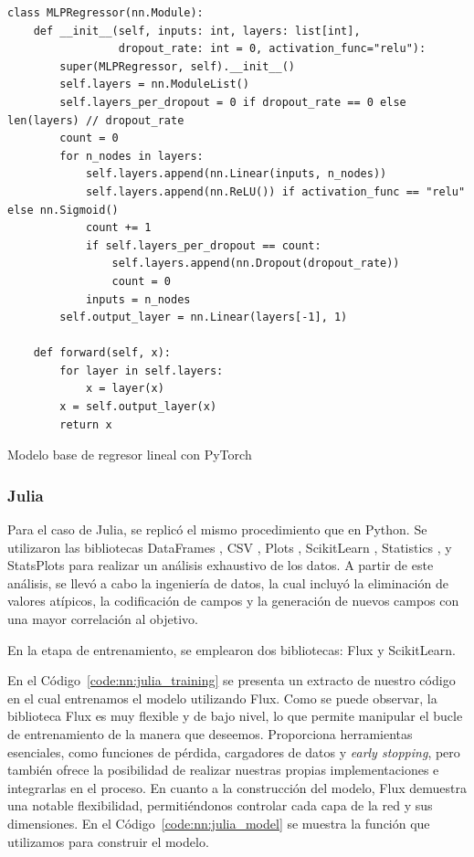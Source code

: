 \documentclass[11pt]{article}
\let\Oldsubsubsection\subsubsection
\renewcommand{\subsubsection}{\FloatBarrier\Oldsubsubsection}
\begin{document}
\begin{listing}[H]
\begin{verbatim}
class MLPRegressor(nn.Module):
    def __init__(self, inputs: int, layers: list[int],
                 dropout_rate: int = 0, activation_func="relu"):
        super(MLPRegressor, self).__init__()
        self.layers = nn.ModuleList()
        self.layers_per_dropout = 0 if dropout_rate == 0 else len(layers) // dropout_rate
        count = 0
        for n_nodes in layers:
            self.layers.append(nn.Linear(inputs, n_nodes))
            self.layers.append(nn.ReLU()) if activation_func == "relu" else nn.Sigmoid()
            count += 1
            if self.layers_per_dropout == count:
                self.layers.append(nn.Dropout(dropout_rate))
                count = 0
            inputs = n_nodes
        self.output_layer = nn.Linear(layers[-1], 1)
        
    def forward(self, x):
        for layer in self.layers:
            x = layer(x)
        x = self.output_layer(x)
        return x
\end{verbatim}
\caption{Modelo base de regresor lineal con PyTorch}
\label{code:nn:python_pytorch}
\end{listing}

\subsubsection{Julia}

Para el caso de Julia, se replicó el mismo procedimiento que en Python. Se utilizaron las bibliotecas DataFrames \cite{jl:lib:dataframe}, CSV \cite{jl:lib:csv}, Plots \cite{jl:lib:plots}, ScikitLearn \cite{jl:lib:scikitlearn}, Statistics \cite{jl:lib:statitics}, y StatsPlots \cite{jl:lib:statsplots} para realizar un análisis exhaustivo de los datos. A partir de este análisis, se llevó a cabo la ingeniería de datos, la cual incluyó la eliminación de valores atípicos, la codificación de campos y la generación de nuevos campos con una mayor correlación al objetivo.

En la etapa de entrenamiento, se emplearon dos bibliotecas: Flux \cite{jl:lib:flux} y ScikitLearn. 

En el Código~\ref{code:nn:julia_training} se presenta un extracto de nuestro código en el cual entrenamos el modelo utilizando Flux. Como se puede observar, la biblioteca Flux es muy flexible y de bajo nivel, lo que permite manipular el bucle de entrenamiento de la manera que deseemos. Proporciona herramientas esenciales, como funciones de pérdida, cargadores de datos y \textit{early stopping}, pero también ofrece la posibilidad de realizar nuestras propias implementaciones e integrarlas en el proceso. En cuanto a la construcción del modelo, Flux demuestra una notable flexibilidad, permitiéndonos controlar cada capa de la red y sus dimensiones. En el Código~\ref{code:nn:julia_model} se muestra la función que utilizamos para construir el modelo.
\end{document}

